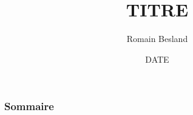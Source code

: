 \documentclass[handout]{beamer}
\title[SUBSTITUT TITRE]{TITRE}
\author{Romain Besland}
\institute[SUBSTITUT INSTITUTE]{INSTITUTE}
\date{DATE}
\let\otp\titlepage
\renewcommand{\titlepage}{\otp\addtocounter{framenumber}{-2}}
\begin{document}
\begin{frame}[plain]
\titlepage
\end{frame}

\begin{frame}
\frametitle{Sommaire}
\tableofcontents
\end{frame}
\end{document}
